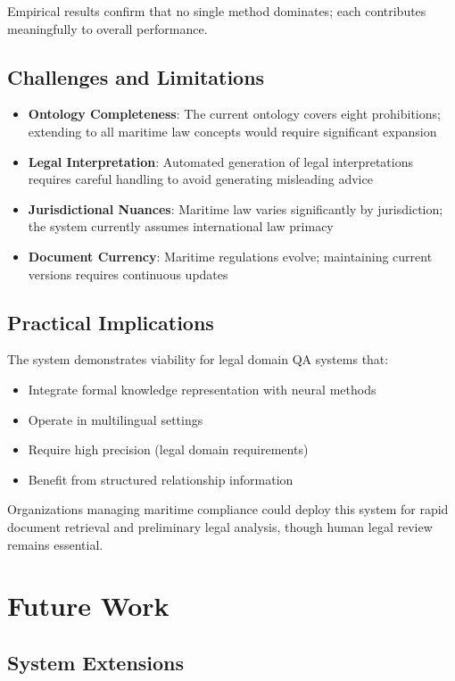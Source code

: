 \documentclass[11pt,a4paper]{article}
\begin{document}
Empirical results confirm that no single method dominates; each contributes meaningfully to overall performance.

\subsection{Challenges and Limitations}

\begin{itemize}
\item \textbf{Ontology Completeness}: The current ontology covers eight prohibitions; extending to all maritime law concepts would require significant expansion
\item \textbf{Legal Interpretation}: Automated generation of legal interpretations requires careful handling to avoid generating misleading advice
\item \textbf{Jurisdictional Nuances}: Maritime law varies significantly by jurisdiction; the system currently assumes international law primacy
\item \textbf{Document Currency}: Maritime regulations evolve; maintaining current versions requires continuous updates
\end{itemize}

\subsection{Practical Implications}

The system demonstrates viability for legal domain QA systems that:
\begin{itemize}
\item Integrate formal knowledge representation with neural methods
\item Operate in multilingual settings
\item Require high precision (legal domain requirements)
\item Benefit from structured relationship information
\end{itemize}

Organizations managing maritime compliance could deploy this system for rapid document retrieval and preliminary legal analysis, though human legal review remains essential.

\section{Future Work}

\subsection{System Extensions}
\end{document}
